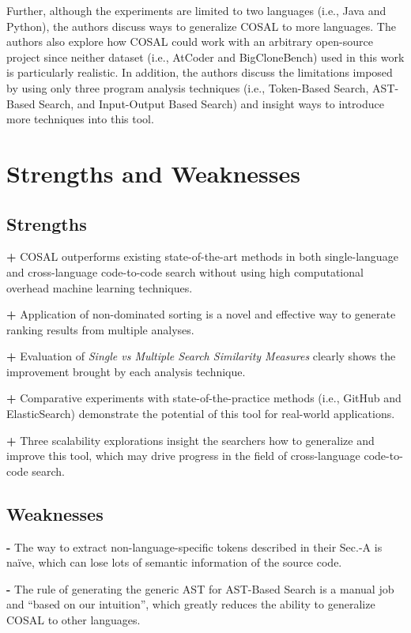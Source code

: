 \documentclass[conference]{IEEEtran}
\newcommand{\RNum}[1]{\uppercase\expandafter{\romannumeral #1\relax}}
\begin{document}
Further, although the experiments are limited to two languages (i.e., Java and Python), the authors discuss ways to generalize COSAL to more languages. The authors also explore how COSAL could work with an arbitrary open-source project since neither dataset (i.e., AtCoder and BigCloneBench) used in this work is particularly realistic. In addition, the authors discuss the limitations imposed by using only three program analysis techniques (i.e., Token-Based Search, AST-Based Search, and Input-Output Based Search) and insight ways to introduce more techniques into this tool.

\section{Strengths and Weaknesses}
\subsection{Strengths}
\textbf{+} COSAL outperforms existing state-of-the-art methods in both single-language and cross-language code-to-code search without using high computational overhead machine learning techniques.

\textbf{+} Application of non-dominated sorting is a novel and effective way to generate ranking results from multiple analyses.

\textbf{+} Evaluation of \textit{Single vs Multiple Search Similarity Measures} clearly shows the improvement brought by each analysis technique.

\textbf{+} Comparative experiments with state-of-the-practice methods (i.e., GitHub and ElasticSearch) demonstrate the potential of this tool for real-world applications.

\textbf{+} Three scalability explorations insight the searchers how to generalize and improve this tool, which may drive progress in the field of cross-language code-to-code search.

\subsection{Weaknesses}\label{sec:weakness}
\textbf{-} The way to extract non-language-specific tokens described in their Sec.\RNum{3}-A is naïve, which can lose lots of semantic information of the source code.

\textbf{-} The rule of generating the generic AST for AST-Based Search is a manual job and “based on our intuition”, which greatly reduces the ability to generalize COSAL to other languages.
\end{document}
